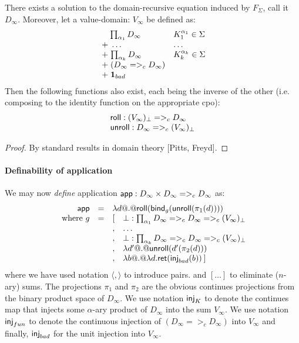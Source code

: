 \documentclass[preprint,nocopyrightspace]{sigplanconf}
\begin{document}
\begin{lemma} There exists a solution to the domain-recursive equation induced by $F_{\Sigma}$, call it $D_{\infty}$.
Moreover, let a value-domain: $V_{\infty}$ be defined as:
    \[\begin{array}{ll}
             \quad\;{\prod_{\alpha_1}{D_{\infty}}} & K_1^{\alpha_1} \in \Sigma \\
             \; + \;\ldots                    & \ldots \\
             \; + \;{\prod_{\alpha_k}{D_{\infty}}} & K_k^{\alpha_k} \in \Sigma \\ 
             \; + \;(D_{\infty} =>_c D_{\infty}) \\
             \; + \;{\sf{\bf 1}}_{bad} \quad
    \end{array}\]
Then the following functions also exist, each being the inverse of the other (i.e. composing to the identity 
function on the appropriate cpo):
\[\begin{array}{l}
  \mathsf{roll} : (V_{\infty})_\bot =>_c D_{\infty} \\ 
  \mathsf{unroll} : D_{\infty} =>_c (V_{\infty})_\bot
\end{array}\] 
\end{lemma}
\begin{proof} By standard results in domain theory [Pitts, Freyd]. \end{proof}

\paragraph{Definability of application}
We may now {\em define} application $\mathsf{app} : D_\infty \times D_\infty =>_c D_\infty$ as: 
{\setlength{\arraycolsep}{2pt}
\[\begin{array}{rcll}
   \dapp & = & \multicolumn{2}{l}{\dlambda d @.@ \roll(\bind_g (\unroll (\pi_1(d))))} \\
   \text{ where } g & = &  [ & \bot : \prod_{\ar_1}{D_\infty} =>_c D_\infty =>_c (V_\infty)_\bot \\
                    &   &  , & \ldots \\
                    &   &  , & \bot : \prod_{\ar_k}{D_\infty} =>_c D_\infty =>_c (V_\infty)_\bot \\
                    &   &  , & \dlambda d' @.@ \unroll(d'(\pi_2(d))) \\
                    &   &  , & \dlambda b @.@ \dlambda d. \ret(\inj{bad}(b))\hspace{2pt} ] 
\end{array}\]}%
where we have used notation $\langle , \rangle$ to introduce pairs. and $[\ldots]$ to eliminate ($n$-ary) sums.
The projections $\pi_1$ and $\pi_2$ are the obvious continues projections from the binary product space of $D_{\infty}$. 
We use notation $\mathsf{inj}_{K}$ to denote the continues map that injects some $\alpha$-ary product of $D_{\infty}$ into the sum $V_{\infty}$.
We use notation $\mathsf{inj}_{fun}$ to denote the continuous injection of $(D_{\infty} =>_c D_{\infty})$ into $V_{\infty}$ and finally, 
$\mathsf{inj}_{bad}$ for the unit injection into $V_{\infty}$.
\end{document}
